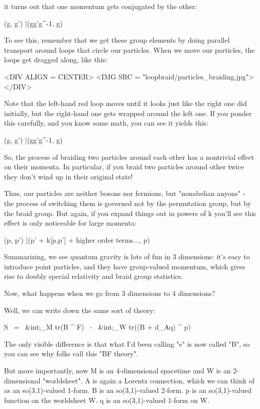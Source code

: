 it turns out that one momentum gets conjugated by the other:

(g, g') |\to  (gg'g^{-1}, g)

To see this, remember that we get these group elements by doing
parallel transport around loops that circle our particles.  When
we move our particles, the loops get dragged along, like this:

<DIV ALIGN = CENTER>
<IMG SRC = "loopbraid/particles_braiding.jpg">
</DIV>

Note that the left-hand red loop moves until it looks just
like the right one did initially, but the right-hand one gets
wrapped around the left one.  If you ponder this carefully, 
and you know some math, you can see it yields this:

(g, g') |\to  (gg'g^{-1}, g)

So, the process of braiding two particles around each other has a
nontrivial effect on their momenta.  In particular, if you braid two
particles around other twice they don't wind up in their original
state!  

Thus, our particles are neither bosons nor fermions, but
"nonabelian anyons" - the process of switching them is
governed not by the permutation group, but by the braid group.  
But again, if you expand things out in powers of k you'll see this 
effect is only noticeable for large momenta:

(p, p') |\to  (p' + k[p,p'] + higher order terms..., p)

Summarizing, we see quantum gravity is lots of fun in 3 dimensions:
it's easy to introduce point particles, and they have group-valued
momentum, which gives rise to doubly special relativity and braid
group statistics.

Now, what happens when we go from 3 dimensions to 4 dimensions?

Well, we can write down the same sort of theory:

S \  = \  
&int;_{M}  tr(B ^ F) \  - \ 
&int;_{W}  tr((B + d_{A}q) ^ p)

The only visible difference is that what I'd been calling
"e" is now called "B", so you can see why folks
call this "BF theory". 

But more importantly, now M is an 4-dimensional spacetime and W is an 
2-dimensional "worldsheet".  A is again a Lorentz connection, which 
we can think of as an so(3,1)-valued 1-form.   B is an so(3,1)-valued 
2-form.  p is an so(3,1)-valued function on the worldsheet W.  q is an 
so(3,1)-valued 1-form on W.

